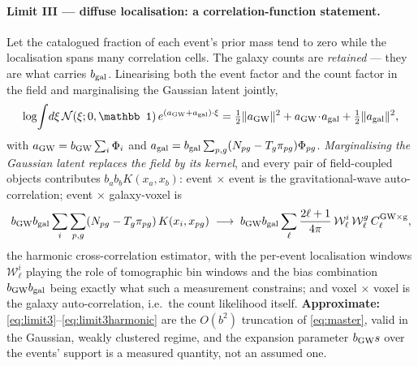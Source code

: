 \documentclass[11pt]{article}
\theoremstyle{definition}
\theoremstyle{remark}
\newcommand{\bgw}{b_{\rm GW}}
\newcommand{\bgal}{b_{\rm gal}}
\begin{document}
\paragraph{Limit III --- diffuse localisation: a correlation-function statement.}
Let the catalogued fraction of each event's prior mass tend to zero while the
localisation spans many correlation cells. The galaxy counts are \emph{retained} ---
they are what carries $\bgal$. Linearising both the event factor and the count factor
in the field and marginalising the Gaussian latent jointly,
\begin{equation}
  \log\!\int\!d\xi\,\mathcal N(\xi;0,\mathbb 1)\,e^{(a_{\rm GW}+a_{\rm gal})\cdot\xi}
  =\tfrac12\|a_{\rm GW}\|^2+a_{\rm GW}\!\cdot\!a_{\rm gal}+\tfrac12\|a_{\rm gal}\|^2 ,
  \label{eq:limit3}
\end{equation}
with $a_{\rm GW}=\bgw\sum_i\Phi_i$ and
$a_{\rm gal}=\bgal\sum_{p,g}(N_{pg}-T_g\pi_{pg})\Phi_{pg}$. \emph{Marginalising the
Gaussian latent replaces the field by its kernel}, and every pair of field-coupled
objects contributes $b_ab_bK(x_a,x_b)$: event$\,\times\,$event is the
gravitational-wave auto-correlation; event$\,\times\,$galaxy-voxel is
\begin{equation}
  \bgw\bgal\sum_i\sum_{p,g}(N_{pg}-T_g\pi_{pg})\,K(x_i,x_{pg})
  \;\longrightarrow\;
  \bgw\bgal\sum_\ell\frac{2\ell+1}{4\pi}\,\mathcal W^i_\ell\,\mathcal W^g_\ell\,
  C_\ell^{\rm GW\times g},
  \label{eq:limit3harmonic}
\end{equation}
the harmonic cross-correlation estimator, with the per-event localisation windows
$\mathcal W^i_\ell$ playing the role of tomographic bin windows and the bias
combination $\bgw\bgal$ being exactly what such a measurement constrains; and
voxel$\,\times\,$voxel is the galaxy auto-correlation, i.e.\ the count likelihood
itself. \textbf{Approximate:} \eqref{eq:limit3}--\eqref{eq:limit3harmonic} are the
$O(b^2)$ truncation of \eqref{eq:master}, valid in the Gaussian, weakly clustered
regime, and the expansion parameter $\bgw s$ over the events' support is a measured
quantity, not an assumed one.
\end{document}

